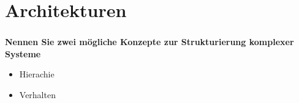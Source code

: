 \setcounter{section}{0}
\part{Architekturen}
\section{}
\textbf{Nennen Sie zwei mögliche Konzepte zur Strukturierung komplexer Systeme}
\begin{itemize}
    \item Hierachie
    \item Verhalten
\end{itemize}